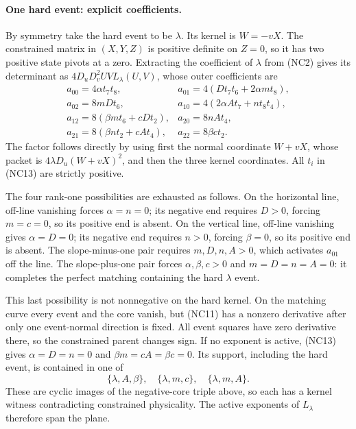 \paragraph{One hard event: explicit coefficients.}
By symmetry take the hard event to be $\lambda$. Its kernel is
$W=-vX$. The constrained matrix in $(X,Y,Z)$ is positive definite
on $Z=0$, so it has two positive state pivots at a zero. Extracting
the coefficient of $\lambda$ from (NC2) gives its determinant as
$4D_uD_v^2UV L_\lambda(U,V)$, whose outer coefficients are
\[
\begin{array}{ll}
a_{00}=4\alpha t_7t_8,&
a_{01}=4(Dt_7t_6+2\alpha mt_8),\\
a_{02}=8mDt_6,&
a_{10}=4(2\alpha At_7+nt_8t_4),\\
a_{12}=8(\beta mt_6+cDt_2),&
a_{20}=8nAt_4,\\
a_{21}=8(\beta nt_2+cAt_4),&
a_{22}=8\beta ct_2.
\end{array}                                                    \tag{NC13}
\]
The factor follows directly by using first the normal coordinate
$W+vX$, whose packet is $4\lambda D_u(W+vX)^2$, and then the
three kernel coordinates. All $t_i$ in (NC13) are strictly positive.

The four rank-one possibilities are exhausted as follows. On the
horizontal line, off-line vanishing forces $\alpha=n=0$; its negative
end requires $D>0$, forcing $m=c=0$, so its positive end is absent.
On the vertical line, off-line vanishing gives $\alpha=D=0$; its
negative end requires $n>0$, forcing $\beta=0$, so its positive end
is absent. The slope-minus-one pair requires $m,D,n,A>0$, which
activates $a_{01}$ off the line. The slope-plus-one pair forces
$\alpha,\beta,c>0$ and $m=D=n=A=0$: it completes the perfect
matching containing the hard $\lambda$ event.

This last possibility is not nonnegative on the hard kernel. On the
matching curve every event and the core vanish, but (NC11) has a
nonzero derivative after only one event-normal direction is fixed.
All event squares have zero derivative there, so the constrained
parent changes sign. If no exponent is active, (NC13) gives
$\alpha=D=n=0$ and $\beta m=cA=\beta c=0$. Its support, including
the hard event, is contained in one of
\[
 \{\lambda,A,\beta\},\quad\{\lambda,m,c\},
 \quad\{\lambda,m,A\}.
\]
These are cyclic images of the negative-core triple above, so each
has a kernel witness contradicting constrained physicality. The
active exponents of $L_\lambda$ therefore span the plane.

